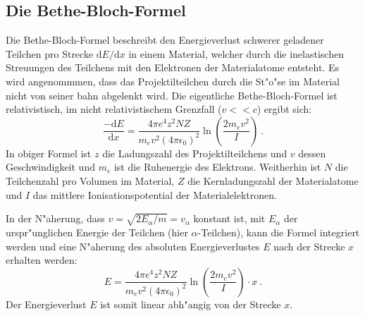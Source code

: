   \subsection{Die Bethe-Bloch-Formel}
    Die Bethe-Bloch-Formel beschreibt den Energieverlust schwerer geladener Teilchen pro Strecke $\text{d}E/\text{d}x$ in einem Material, welcher durch die inelastischen Streuungen des Teilchens mit den Elektronen der Materialatome entsteht.
    Es wird angenommmen, dass das Projektilteilchen durch die St"o"se im Material nicht von seiner bahn abgelenkt wird.
    Die eigentliche Bethe-Bloch-Formel ist relativistisch, im nicht relativistischem Grenzfall ($v<<c$) ergibt sich:
    \begin{equation}
      \frac{-\text{d}E}{\text{d}x} = \frac{4\pi e^4z^2NZ}{m_ev^2(4\pi \epsilon_0)^2}\ln \left(\frac{2m_ev^2}{I}\right) \: .
    \end{equation}
    In obiger Formel ist $z$ die Ladungszahl des Projektilteilchens und $v$ dessen Geschwindigkeit und $m_e$ ist die Ruhenergie des Elektrons.
    Weitherhin ist $N$ die Teilchenzahl pro Volumen im Material, $Z$ die Kernladungszahl der Materialatome und $I$ das mittlere Ionisationspotential der Materialelektronen.

    In der N"aherung, dass $v=\sqrt{2E_{\alpha}/m}=v_{\alpha}$ konstant ist, mit $E_{\alpha}$ der urspr"unglichen Energie der Teilchen (hier $\alpha$-Teilchen), kann die Formel integriert werden und eine N"aherung des absoluten Energieverlustes $E$ nach der Strecke $x$ erhalten werden:
    \begin{equation}
      E = \frac{4\pi e^4z^2NZ}{m_ev^2(4\pi \epsilon_0)^2}\ln \left(\frac{2m_ev^2}{I}\right) \cdot x
      \label{bethe} \: .
    \end{equation}
    Der Energieverlust $E$ ist somit linear abh"angig von der Strecke $x$.




